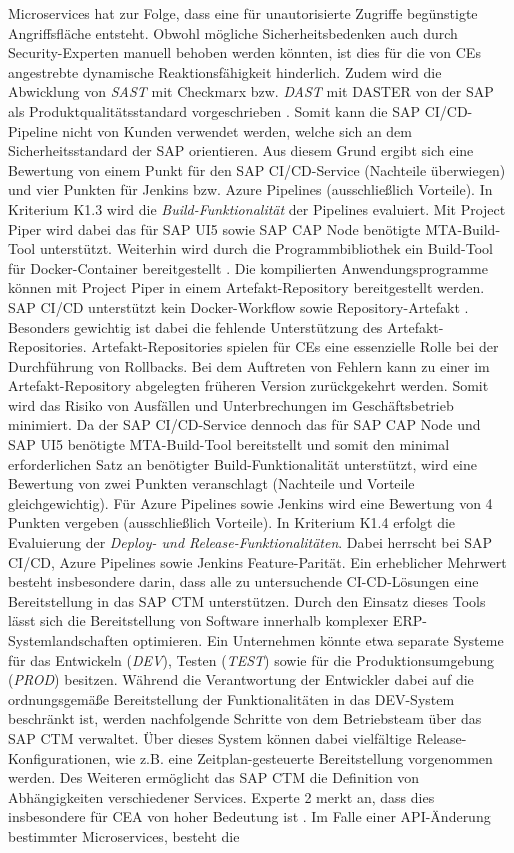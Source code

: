 Microservices hat zur Folge, dass eine für unautorisierte Zugriffe begünstigte Angriffsfläche entsteht. Obwohl mögliche Sicherheitsbedenken auch durch Security-Experten manuell behoben werden könnten, ist dies für die von CEs angestrebte dynamische Reaktionsfähigkeit hinderlich. Zudem wird die Abwicklung von \textit{\ac{SAST}} mit Checkmarx bzw. \textit{\ac{DAST}} mit DASTER von der SAP als Produktqualitätsstandard vorgeschrieben \cite[Z. 37 ff.]{ProductManagerSAPHyperspaceSecurityTools.}. Somit kann die SAP CI/CD-Pipeline nicht von Kunden verwendet werden, welche sich an dem Sicherheitsstandard der SAP orientieren. Aus diesem Grund ergibt sich eine Bewertung von einem Punkt für den SAP CI/CD-Service (Nachteile überwiegen) und vier Punkten für Jenkins bzw. Azure Pipelines (ausschließlich Vorteile). In Kriterium K1.3 wird die \textit{Build-Funktionalität} der Pipelines evaluiert. Mit Project Piper wird dabei das für SAP UI5 sowie SAP CAP Node benötigte MTA-Build-Tool unterstützt. Weiterhin wird durch die Programmbibliothek ein Build-Tool für Docker-Container bereitgestellt \cite{.20230406}. Die kompilierten Anwendungsprogramme können mit Project Piper in einem Artefakt-Repository bereitgestellt werden. SAP CI/CD unterstützt kein Docker-Workflow sowie Repository-Artefakt \cite{.20230406b}. Besonders gewichtig ist dabei die fehlende Unterstützung des Artefakt-Repositories. Artefakt-Repositories spielen für CEs eine essenzielle Rolle bei der Durchführung von Rollbacks. Bei dem Auftreten von Fehlern kann zu einer im Artefakt-Repository abgelegten früheren Version zurückgekehrt werden. Somit wird das Risiko von Ausfällen und Unterbrechungen im Geschäftsbetrieb minimiert. Da der SAP CI/CD-Service dennoch das für SAP CAP Node und SAP UI5 benötigte MTA-Build-Tool bereitstellt und somit den minimal erforderlichen Satz an benötigter Build-Funktionalität unterstützt, wird eine Bewertung von zwei Punkten veranschlagt (Nachteile und Vorteile gleichgewichtig). Für Azure Pipelines sowie Jenkins wird eine Bewertung von 4 Punkten vergeben (ausschließlich Vorteile). In Kriterium K1.4 erfolgt die Evaluierung der \textit{Deploy- und Release-Funktionalitäten}. Dabei herrscht bei SAP CI/CD, Azure Pipelines sowie Jenkins Feature-Parität. Ein erheblicher Mehrwert besteht insbesondere darin, dass alle zu untersuchende CI-CD-Lösungen eine Bereitstellung in das SAP CTM unterstützen. Durch den Einsatz dieses Tools lässt sich die Bereitstellung von Software innerhalb komplexer ERP-Systemlandschaften optimieren. Ein Unternehmen könnte etwa separate Systeme für das Entwickeln (\textit{DEV}), Testen (\textit{TEST}) sowie für die Produktionsumgebung (\textit{PROD}) besitzen. Während die Verantwortung der Entwickler dabei auf die ordnungsgemäße Bereitstellung der Funktionalitäten in das DEV-System beschränkt ist, werden nachfolgende Schritte von dem Betriebsteam über das SAP CTM verwaltet. Über dieses System können dabei vielfältige Release-Konfigurationen, wie z.B. eine Zeitplan-gesteuerte Bereitstellung vorgenommen werden. Des Weiteren ermöglicht das SAP CTM die Definition von Abhängigkeiten verschiedener Services. Experte 2 merkt an, dass dies insbesondere für CEA von hoher Bedeutung ist \cite[Z. 64]{ProductManagerSAPHyperspaceCICD.}. Im Falle einer API-Änderung bestimmter Microservices, besteht die 